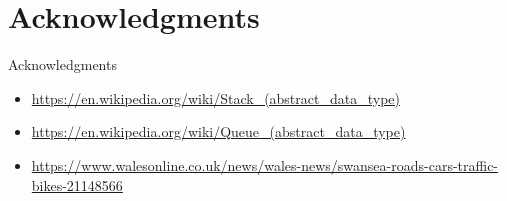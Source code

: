\documentclass[t,handout,9pt]{beamer}
\begin{document}
\section{Acknowledgments}
\begin{frame}{Acknowledgments}
\begin{itemize}
	\item \url{https://en.wikipedia.org/wiki/Stack_(abstract_data_type)}
	\item \url{https://en.wikipedia.org/wiki/Queue_(abstract_data_type)}
	\item \url{https://www.walesonline.co.uk/news/wales-news/swansea-roads-cars-traffic-bikes-21148566}
\end{itemize}
\end{frame}
%

\end{document}
